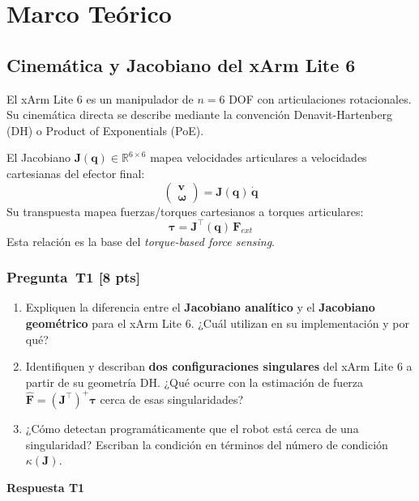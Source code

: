 \documentclass[journal,10pt,twoside]{IEEEtran}
\newcommand{\pts}[1]{\textbf{\color{tec_red}[#1 pts]}}
\begin{document}
\section{Marco Teórico}
\label{sec:background}

\subsection{Cinemática y Jacobiano del xArm Lite 6}

El xArm Lite 6 es un manipulador de $n=6$ DOF con articulaciones
rotacionales. Su cinemática directa se describe mediante la convención
Denavit-Hartenberg (DH) o Product of Exponentials (PoE).

\begin{theorybox}
  El Jacobiano $\bm{J}(\bm{q}) \in \mathbb{R}^{6\times6}$ mapea
  velocidades articulares a velocidades cartesianas del efector final:
  \[
    \begin{pmatrix} \bm{v} \\ \bm{\omega} \end{pmatrix} = \bm{J}(\bm{q})\,\dot{\bm{q}}
  \]
  Su transpuesta mapea fuerzas/torques cartesianos a torques articulares:
  \[
    \bm{\tau} = \bm{J}^\top(\bm{q})\,\bm{F}_{ext}
  \]
  Esta relación es la base del \emph{torque-based force sensing}.
\end{theorybox}

\subsubsection*{Pregunta~T1 \pts{8}}
\begin{enumerate}[label=(\alph*)]
  \item Expliquen la diferencia entre el \textbf{Jacobiano analítico}
        y el \textbf{Jacobiano geométrico} para el xArm Lite 6.
        ¿Cuál utilizan en su implementación y por qué?
  \item Identifiquen y describan \textbf{dos configuraciones singulares}
        del xArm Lite 6 a partir de su geometría DH. ¿Qué ocurre con la
        estimación de fuerza $\hat{\bm{F}} = (\bm{J}^\top)^+\bm{\tau}$
        cerca de esas singularidades?
  \item ¿Cómo detectan programáticamente que el robot está cerca de
        una singularidad? Escriban la condición en términos del
        número de condición $\kappa(\bm{J})$.
\end{enumerate}
\textbf{Respuesta T1}
\end{document}
